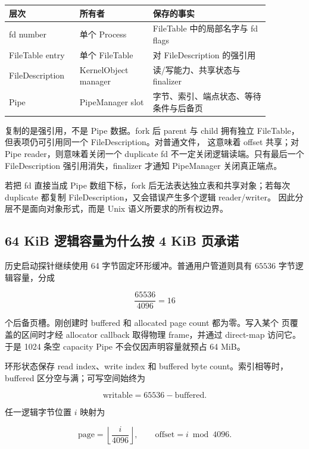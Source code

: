 \begin{center}
\begin{tabular}{L{0.22\linewidth}L{0.25\linewidth}L{0.40\linewidth}}
\toprule
层次 & 所有者 & 保存的事实 \\
\midrule
fd number & 单个 Process & FileTable 中的局部名字与 fd flags \\
FileTable entry & 单个 FileTable & 对 FileDescription 的强引用 \\
FileDescription & KernelObject manager & 读/写能力、共享状态与 finalizer \\
Pipe & PipeManager slot & 字节、索引、端点状态、等待条件与后备页 \\
\bottomrule
\end{tabular}
\end{center}

 复制的是强引用，不是 Pipe 数据。fork 后 parent 与 child
拥有独立 FileTable，但表项仍可引用同一个 FileDescription。对普通文件，
这意味着 offset 共享；对 Pipe reader，则意味着关闭一个 duplicate fd
不一定关闭逻辑读端。只有最后一个 FileDescription 强引用消失，finalizer
才通知 PipeManager 关闭真正端点。

若把 fd 直接当成 Pipe 数组下标，fork 后无法表达独立表和共享对象；若每次
duplicate 都复制 FileDescription，又会错误产生多个逻辑 reader/writer。
因此分层不是面向对象形式，而是 Unix 语义所要求的所有权边界。

\subsection{64 KiB 逻辑容量为什么按 4 KiB 页承诺}

历史启动探针继续使用 64 字节固定环形缓冲。普通用户管道则具有
\(65536\) 字节逻辑容量，分成

\[
  \frac{65536}{4096}=16
\]

个后备页槽。刚创建时 buffered 和 allocated page count 都为零。写入某个
页覆盖的区间时才经 allocator callback 取得物理 frame，并通过 direct-map
访问它。于是 1024 条空 capacity Pipe 不会仅因声明容量就预占 64 MiB。

环形状态保存 read index、write index 和 buffered byte count。索引相等时，
buffered 区分空与满；可写空间始终为

\[
  \mathrm{writable}=65536-\mathrm{buffered}.
\]

任一逻辑字节位置 \(i\) 映射为

\[
  \mathrm{page}=\left\lfloor\frac{i}{4096}\right\rfloor,\qquad
  \mathrm{offset}=i\bmod4096.
\]

